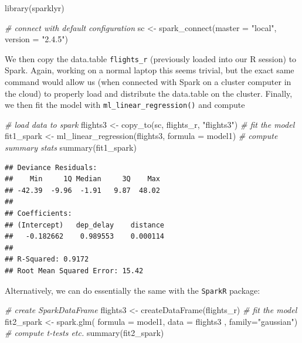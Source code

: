 \documentclass[
  12pt,
]{style/krantz}
\newenvironment{Shaded}{\begin{snugshade}}{\end{snugshade}}
\newcommand{\AttributeTok}[1]{\textcolor[rgb]{0.77,0.63,0.00}{#1}}
\newcommand{\CommentTok}[1]{\textcolor[rgb]{0.56,0.35,0.01}{\textit{#1}}}
\newcommand{\FunctionTok}[1]{\textcolor[rgb]{0.00,0.00,0.00}{#1}}
\newcommand{\NormalTok}[1]{#1}
\newcommand{\OtherTok}[1]{\textcolor[rgb]{0.56,0.35,0.01}{#1}}
\newcommand{\StringTok}[1]{\textcolor[rgb]{0.31,0.60,0.02}{#1}}
\begin{document}
\begin{Shaded}
\begin{Highlighting}[]
\FunctionTok{library}\NormalTok{(sparklyr)}

\CommentTok{\# connect with default configuration}
\NormalTok{sc }\OtherTok{\textless{}{-}} \FunctionTok{spark\_connect}\NormalTok{(}\AttributeTok{master =} \StringTok{"local"}\NormalTok{, }
                    \AttributeTok{version =} \StringTok{"2.4.5"}\NormalTok{)}
\end{Highlighting}
\end{Shaded}

We then copy the data.table \texttt{flights\_r} (previously loaded into our R session) to Spark. Again, working on a normal laptop this seems trivial, but the exact same command would allow us (when connected with Spark on a cluster computer in the cloud) to properly load and distribute the data.table on the cluster. Finally, we then fit the model with \texttt{ml\_linear\_regression()} and compute

\begin{Shaded}
\begin{Highlighting}[]
\CommentTok{\# load data to spark}
\NormalTok{flights3 }\OtherTok{\textless{}{-}} \FunctionTok{copy\_to}\NormalTok{(sc, flights\_r, }\StringTok{"flights3"}\NormalTok{)}
\CommentTok{\# fit the model}
\NormalTok{fit1\_spark }\OtherTok{\textless{}{-}} \FunctionTok{ml\_linear\_regression}\NormalTok{(flights3, }\AttributeTok{formula =}\NormalTok{ model1)}
\CommentTok{\# compute summary stats}
\FunctionTok{summary}\NormalTok{(fit1\_spark)}
\end{Highlighting}
\end{Shaded}

\begin{verbatim}
## Deviance Residuals:
##    Min     1Q Median     3Q    Max 
## -42.39  -9.96  -1.91   9.87  48.02 
## 
## Coefficients:
## (Intercept)   dep_delay    distance 
##   -0.182662    0.989553    0.000114 
## 
## R-Squared: 0.9172
## Root Mean Squared Error: 15.42
\end{verbatim}

Alternatively, we can do essentially the same with the \texttt{SparkR} package:

\begin{Shaded}
\begin{Highlighting}[]
\CommentTok{\# create SparkDataFrame}
\NormalTok{flights3 }\OtherTok{\textless{}{-}} \FunctionTok{createDataFrame}\NormalTok{(flights\_r)}
\CommentTok{\# fit the model}
\NormalTok{fit2\_spark }\OtherTok{\textless{}{-}} \FunctionTok{spark.glm}\NormalTok{( }\AttributeTok{formula =}\NormalTok{ model1, }\AttributeTok{data =}\NormalTok{ flights3 , }\AttributeTok{family=}\StringTok{"gaussian"}\NormalTok{)}
\CommentTok{\# compute t{-}tests etc.}
\FunctionTok{summary}\NormalTok{(fit2\_spark)}
\end{Highlighting}
\end{Shaded}
\end{document}
